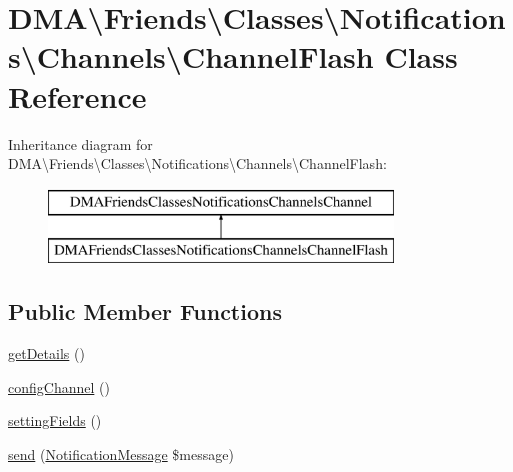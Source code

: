 \hypertarget{classDMA_1_1Friends_1_1Classes_1_1Notifications_1_1Channels_1_1ChannelFlash}{\section{D\+M\+A\textbackslash{}Friends\textbackslash{}Classes\textbackslash{}Notifications\textbackslash{}Channels\textbackslash{}Channel\+Flash Class Reference}
\label{classDMA_1_1Friends_1_1Classes_1_1Notifications_1_1Channels_1_1ChannelFlash}
}
Inheritance diagram for D\+M\+A\textbackslash{}Friends\textbackslash{}Classes\textbackslash{}Notifications\textbackslash{}Channels\textbackslash{}Channel\+Flash\+:\begin{figure}[H]
\begin{center}
\leavevmode
\includegraphics[height=2.000000cm]{d0/d0a/classDMA_1_1Friends_1_1Classes_1_1Notifications_1_1Channels_1_1ChannelFlash}
\end{center}
\end{figure}
\subsection*{Public Member Functions}
\begin{DoxyCompactItemize}
\item 
\hyperlink{classDMA_1_1Friends_1_1Classes_1_1Notifications_1_1Channels_1_1ChannelFlash_a6091ca1294d5403b1296453707f999dc}{get\+Details} ()
\item 
\hyperlink{classDMA_1_1Friends_1_1Classes_1_1Notifications_1_1Channels_1_1ChannelFlash_a23aedb378d89657d3f4dc8e9d5816298}{config\+Channel} ()
\item 
\hyperlink{classDMA_1_1Friends_1_1Classes_1_1Notifications_1_1Channels_1_1ChannelFlash_a2723fe00029a298fba373d5397a11fb0}{setting\+Fields} ()
\item 
\hyperlink{classDMA_1_1Friends_1_1Classes_1_1Notifications_1_1Channels_1_1ChannelFlash_aca92ab6f8c53e038b7b29ab1243c18b5}{send} (\hyperlink{classDMA_1_1Friends_1_1Classes_1_1Notifications_1_1NotificationMessage}{Notification\+Message} \$message)
\end{DoxyCompactItemize}
